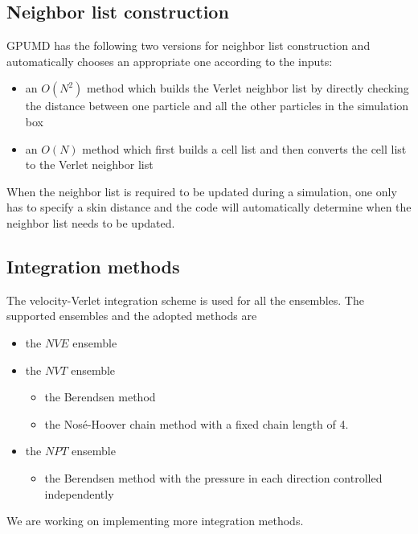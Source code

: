 \documentclass[12pt,a4paper]{report}
\begin{document}
\subsection{Neighbor list construction}

GPUMD has the following two versions for neighbor list construction and automatically chooses an appropriate one according to the inputs:
  \begin{itemize}
  \item an $O(N^2)$ method which builds the Verlet neighbor list by directly checking the distance between one particle and all the other particles in the simulation box
  \item an $O(N)$ method which first builds a cell list and then converts the cell list to the Verlet neighbor list
  \end{itemize}
When the neighbor list is required to be updated during a simulation, one only has to specify a skin distance and the code will automatically determine when the neighbor list needs to be updated.

\subsection{Integration methods}

The velocity-Verlet \cite{swope1982jcp} integration scheme is used for all the ensembles.
The supported ensembles and the adopted methods are
  \begin{itemize}
  \item the $NVE$ ensemble
  \item the $NVT$ ensemble
    \begin{itemize}
    \item the Berendsen method  \cite{berendsen1984jcp}
    \item the Nos\'{e}-Hoover chain method \cite{nose1984jcp,hoover1985pra,martyna1992jcp,martyna1996mp,tuckerman2010}
        with a fixed chain length of 4.
    \end{itemize}
  \item the $NPT$ ensemble
    \begin{itemize}
    \item the Berendsen method  \cite{berendsen1984jcp} with the pressure in each direction controlled independently
    \end{itemize}
  \end{itemize}

We are working on implementing more integration methods.
\end{document}

